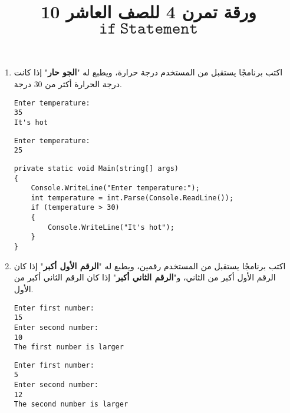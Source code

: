 \documentclass[12pt, twoside]{article}
\title{ورقة تمرن 4 للصف العاشر 10 $\mathtt{if\ Statement}$}
\begin{document}
\maketitle
\thispagestyle{fancy}

\ifdetailed
\begin{enumerate}[itemsep=3em]
\else
\begin{enumerate}
\fi


\item
اكتب برنامجًا يستقبل من المستخدم درجة حرارة، ويطبع له "\textbf{الجو حار}" إذا كانت درجة الحرارة أكثر من 30 درجة.
\ifdetailed
\begin{boxExample}[1]
\begin{english}
\begin{verbatim}
Enter temperature:
35
It's hot
\end{verbatim}
\end{english}
\end{boxExample}

\begin{boxExample}[2]
\begin{english}
\begin{verbatim}
Enter temperature:
25
\end{verbatim}
\end{english}
\end{boxExample}

\ifwithsols
\begin{boxSolution}
\begin{english}
\begin{verbatim}
private static void Main(string[] args)
{
    Console.WriteLine("Enter temperature:");
    int temperature = int.Parse(Console.ReadLine());
    if (temperature > 30)
    {
        Console.WriteLine("It's hot");
    }
}
\end{verbatim}
\end{english}
\end{boxSolution}
\clearpage
\fi
\fi

\item
اكتب برنامجًا يستقبل من المستخدم رقمين، ويطبع له "\textbf{الرقم الأول أكبر}" إذا كان الرقم الأول أكبر من الثاني، و"\textbf{الرقم الثاني أكبر}" إذا كان الرقم الثاني أكبر من الأول.
\ifdetailed
\begin{boxExample}[1]
\begin{english}
\begin{verbatim}
Enter first number:
15
Enter second number:
10
The first number is larger
\end{verbatim}
\end{english}
\end{boxExample}
\begin{boxExample}[2]
\begin{english}
\begin{verbatim}
Enter first number:
5
Enter second number:
12
The second number is larger
\end{verbatim}
\end{english}
\end{boxExample}


\end{enumerate}
\end{enumerate}
\end{document}
